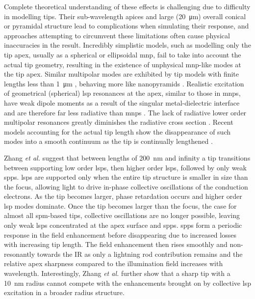 \documentclass{article}
\begin{document}
Complete theoretical understanding of these effects is challenging due to difficulty in modelling tips. Their sub-wavelength apices and large (\SI{20}{\micro\metre}) overall conical or pyramidal structure lead to complications when simulating their response, and approaches attempting to circumvent these limitations often cause physical inaccuracies in the result.
Incredibly simplistic models, such as modelling only the tip apex, usually as a spherical or ellipsoidal \gls{mnp}, fail to take into account the actual tip geometry, resulting in the existence of unphysical \gls{mnp}-like modes at the tip apex. Similar multipolar modes are exhibited by tip models with finite lengths less than \SI{1}{\micro\metre} \cite{roth2006, goncharenko2006}, behaving more like nanopyramids \cite{schafer2013, cherukulappurath2013}. Realistic excitation of geometrical (spherical) \gls{lsp} resonances at the apex, similar to those in \glspl{mnp}, have weak dipole moments as a result of the singular metal-dielectric interface and are therefore far less radiative than \glspl{mnp} \cite{downes2006}. {\color{red}The lack of radiative lower order multipolar resonances greatly diminishes the radiative cross section \cite{renger2004}.} Recent models accounting for the actual tip length show the disappearance of such modes into a smooth continuum as the tip is continually lengthened \cite{zhang2009}.

Zhang \emph{et al.} \cite{zhang2009} suggest that between lengths of \SI{200}{nm} and infinity a tip transitions between supporting low order \glspl{lsp}, then higher order \glspl{lsp}, followed by only weak \glspl{spp}. \Glspl{lsp} are supported only when the entire tip structure is smaller in size than the focus, allowing light to drive in-phase collective oscillations of the conduction electrons. As the tip becomes larger, phase retardation occurs and higher order \gls{lsp} modes dominate. Once the tip becomes larger than the focus, the case for almost all \gls{spm}-based tips, collective oscillations are no longer possible, leaving only weak \glspl{lsp} concentrated at the apex surface and \glspl{spp}. \Glspl{spp} form a periodic response in the field enhancement before disappearing due to increased losses with increasing tip length. The field enhancement then rises smoothly and non-resonantly towards the IR as only a lightning rod contribution remains and the relative apex sharpness compared to the illumination field increases with wavelength. Interestingly, Zhang \emph{et al.} further show that a sharp tip with a \SI{10}{nm} radius cannot compete with the enhancements brought on by collective \gls{lsp} excitation in a broader radius structure. %
\end{document}
